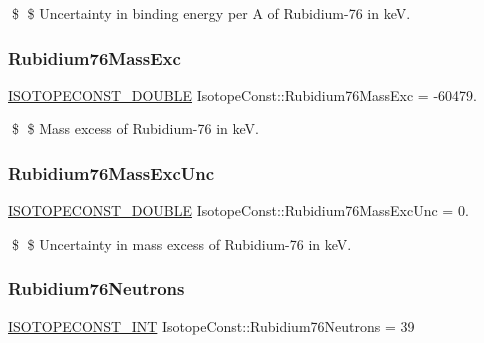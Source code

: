 \$ \$ Uncertainty in binding energy per A of Rubidium-\/76 in keV. \mbox{\label{group___isotope_const-_rubidium-_rb76_gad1c731c354d7d6945664c25d9cbd10f5}} 
\subsubsection{\texorpdfstring{Rubidium76\+Mass\+Exc}{Rubidium76MassExc}}
{\footnotesize\ttfamily \mbox{\hyperlink{group___isotope_const-_macros_ga8f45a7272ce02c0b4c65c44636ed719a}{I\+S\+O\+T\+O\+P\+E\+C\+O\+N\+S\+T\+\_\+\+D\+O\+U\+B\+LE}} Isotope\+Const\+::\+Rubidium76\+Mass\+Exc = -\/60479.}

\$ \$ Mass excess of Rubidium-\/76 in keV. \mbox{\label{group___isotope_const-_rubidium-_rb76_gaf885cc83d4a242a77a4f14cd0bf5e4de}} 
\subsubsection{\texorpdfstring{Rubidium76\+Mass\+Exc\+Unc}{Rubidium76MassExcUnc}}
{\footnotesize\ttfamily \mbox{\hyperlink{group___isotope_const-_macros_ga8f45a7272ce02c0b4c65c44636ed719a}{I\+S\+O\+T\+O\+P\+E\+C\+O\+N\+S\+T\+\_\+\+D\+O\+U\+B\+LE}} Isotope\+Const\+::\+Rubidium76\+Mass\+Exc\+Unc = 0.}

\$ \$ Uncertainty in mass excess of Rubidium-\/76 in keV. \mbox{\label{group___isotope_const-_rubidium-_rb76_ga710581618c964af5ab137798797d198a}} 
\subsubsection{\texorpdfstring{Rubidium76\+Neutrons}{Rubidium76Neutrons}}
{\footnotesize\ttfamily \mbox{\hyperlink{group___isotope_const-_macros_ga5f18360b3e99483a35c32d789e62621c}{I\+S\+O\+T\+O\+P\+E\+C\+O\+N\+S\+T\+\_\+\+I\+NT}} Isotope\+Const\+::\+Rubidium76\+Neutrons = 39}

